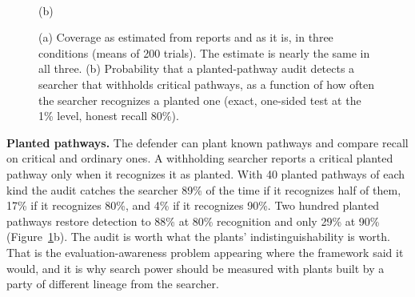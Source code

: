 \documentclass[10pt,twocolumn,letterpaper]{article}
\theoremstyle{definition}
\newcommand{\para}[1]{\smallskip\noindent\textbf{#1}\enspace}
\newcommand{\AuditFortyHalf}{89}
\newcommand{\AuditFortyEighty}{17}
\newcommand{\AuditFortyNinety}{4}
\newcommand{\AuditTwoHundredEighty}{88}
\newcommand{\AuditTwoHundredNinety}{29}
\begin{document}
\begin{figure}[t]
\begin{minipage}[t]{0.44\textwidth}
\centering
{}\\[-2pt]
{\scriptsize (b)}
\end{minipage}
\caption{(a) Coverage as estimated from reports and as it is, in three conditions (means of 200 trials). The estimate is nearly the same in all three. (b) Probability that a planted-pathway audit detects a searcher that withholds critical pathways, as a function of how often the searcher recognizes a planted one (exact, one-sided test at the 1\% level, honest recall 80\%).}
\label{fig:coverage}
\end{figure}

\para{Planted pathways.} The defender can plant known pathways and compare recall on critical and ordinary ones. A withholding searcher reports a critical planted pathway only when it recognizes it as planted. With 40 planted pathways of each kind the audit catches the searcher \AuditFortyHalf\% of the time if it recognizes half of them, \AuditFortyEighty\% if it recognizes 80\%, and \AuditFortyNinety\% if it recognizes 90\%. Two hundred planted pathways restore detection to \AuditTwoHundredEighty\% at 80\% recognition and only \AuditTwoHundredNinety\% at 90\% (Figure~\ref{fig:coverage}b). The audit is worth what the plants' indistinguishability is worth. That is the evaluation-awareness problem \cite{needham} appearing where the framework said it would, and it is why search power should be measured with plants built by a party of different lineage from the searcher.
\end{document}
